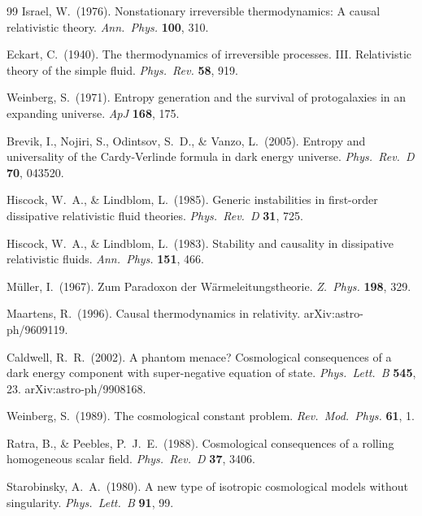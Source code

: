 \documentclass[12pt,a4paper]{article}
\begin{document}
\begin{thebibliography}{99}
Israel, W.\ (1976).
Nonstationary irreversible thermodynamics: A causal relativistic theory.
\textit{Ann.\ Phys.} \textbf{100}, 310.

Eckart, C.\ (1940).
The thermodynamics of irreversible processes. III. Relativistic theory of the simple fluid.
\textit{Phys.\ Rev.} \textbf{58}, 919.

Weinberg, S.\ (1971).
Entropy generation and the survival of protogalaxies in an expanding universe.
\textit{ApJ} \textbf{168}, 175.

Brevik, I., Nojiri, S., Odintsov, S.~D., \& Vanzo, L.\ (2005).
Entropy and universality of the Cardy-Verlinde formula in dark energy universe.
\textit{Phys.\ Rev.\ D} \textbf{70}, 043520.

Hiscock, W.~A., \& Lindblom, L.\ (1985).
Generic instabilities in first-order dissipative relativistic fluid theories.
\textit{Phys.\ Rev.\ D} \textbf{31}, 725.

Hiscock, W.~A., \& Lindblom, L.\ (1983).
Stability and causality in dissipative relativistic fluids.
\textit{Ann.\ Phys.} \textbf{151}, 466.

M{\"u}ller, I.\ (1967).
Zum Paradoxon der W{\"a}rmeleitungstheorie.
\textit{Z.\ Phys.} \textbf{198}, 329.

Maartens, R.\ (1996).
Causal thermodynamics in relativity.
arXiv:astro-ph/9609119.

Caldwell, R.~R.\ (2002).
A phantom menace? Cosmological consequences of a dark energy component with super-negative equation of state.
\textit{Phys.\ Lett.\ B} \textbf{545}, 23. arXiv:astro-ph/9908168.

Weinberg, S.\ (1989).
The cosmological constant problem.
\textit{Rev.\ Mod.\ Phys.} \textbf{61}, 1.

Ratra, B., \& Peebles, P.~J.~E.\ (1988).
Cosmological consequences of a rolling homogeneous scalar field.
\textit{Phys.\ Rev.\ D} \textbf{37}, 3406.

Starobinsky, A.~A.\ (1980).
A new type of isotropic cosmological models without singularity.
\textit{Phys.\ Lett.\ B} \textbf{91}, 99.


\end{thebibliography}
\end{document}
